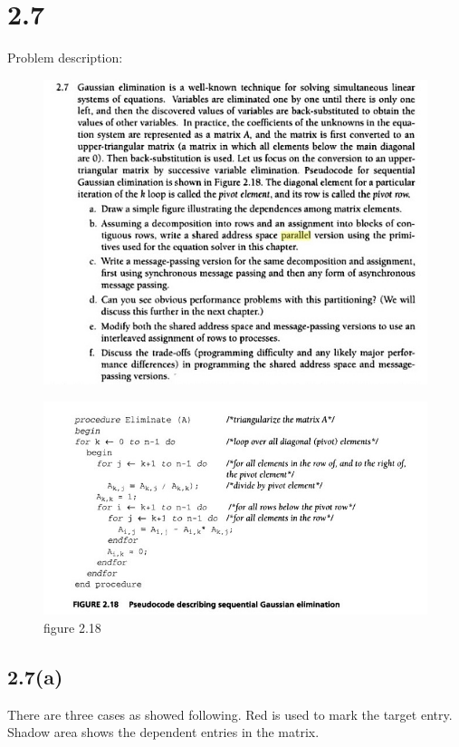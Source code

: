 \section{2.7}

Problem description:
\begin{figure} [H]
\includegraphics[width=\textwidth]{figures/2-7-problem.jpg}
\end{figure}

\begin{figure} [H]
\includegraphics[width=\textwidth]{figures/figure2-18.jpg}
\caption{figure 2.18}
\end{figure} 

\subsection{2.7(a)}

There are three cases as showed following. Red is used to mark the target entry. 
Shadow area shows the dependent entries in the matrix. 

